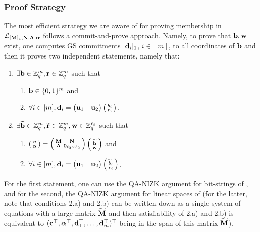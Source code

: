 \subsubsection{Proof Strategy} The most efficient strategy we are aware of for proving membership in $\mathcal{L}_{[\mathbf{{M}}]_1,\mathbf{{N}},\mathbf{{\Lambda}},{\boldsymbol \alpha}}$ follows a 
 commit-and-prove approach. Namely, to prove that $\mathbf{b},\mathbf{w}$ exist, one computes 
GS commitments $[\mathbf{d}_i]_1$, $i \in [m]$, to all coordinates of $\mathbf{b}$ and then it proves two independent statements, namely that:
\vspace{-0.2cm}
\begin{enumerate}
\item $\exists \mathbf{b}\in \mathbb{Z}_q^{m}, \mathbf{r} \in \mathbb{Z}_q^m$ such that  
    \begin{enumerate}
    \item $ \mathbf{b}\in \{0,1\}^{m}$ and 
    \item $\forall i \in [{m}], \mathbf{d}_i=\begin{pmatrix} \mathbf{u}_1 &   \mathbf{u}_2 \end{pmatrix}   \left(\begin{smallmatrix}b_i  \\ r_i\end{smallmatrix}\right)$.
    \end{enumerate}
\item   $\exists \widetilde{\mathbf{b}} \in \mathbb{Z}_q^{m},  \widetilde{\mathbf{r}} \in \mathbb{Z}_q^m, \mathbf{w} \in\mathbb{Z}_q^{\ell_2}$ such that
    \begin{enumerate}
    \item $\left(\begin{smallmatrix}
    \mathbf{c}\\
    {\boldsymbol \alpha}
\end{smallmatrix}\right)
=
\left(\begin{smallmatrix}
    \mathbf{{M}}       & \mathbf{{N}}\\
    \mathbf{{\Lambda}} & \mathbf{{0}}_{{\ell_3}\times {\ell_2}}
\end{smallmatrix}\right)
\left(\begin{smallmatrix}
    \widetilde{\mathbf{b}}\\
    \mathbf{w}
\end{smallmatrix}\right)$ and 
    \item $\forall i \in [m], \mathbf{d}_i=\begin{pmatrix} \mathbf{u}_1 &   \mathbf{u}_2 \end{pmatrix}   \left(\begin{smallmatrix}
\widetilde{b}_i  \\ r_i\end{smallmatrix}\right)$.
    \end{enumerate}
\end{enumerate}
For the first statement, one can use the QA-NIZK argument for bit-strings of \cite{AC:GonHevRaf15}, and for the second, the QA-NIZK argument for linear spaces of \cite{C:JutRoy14,EC:KilWee15} (for the latter, note that conditions 2.a) and 2.b) can be written down as a single system of equations with a large matrix $\widetilde{\mathbf{{M}}}$ and then satisfiability of 2.a) and 2.b) is equivalent to  $(\mathbf{c}^{\top},{\boldsymbol \alpha}^{\top},\mathbf{d}_1^{\top}, \ldots, \mathbf{d}_m^{\top})^\top$ being in the span 
of this matrix $\widetilde{\mathbf{{M}}}$).

